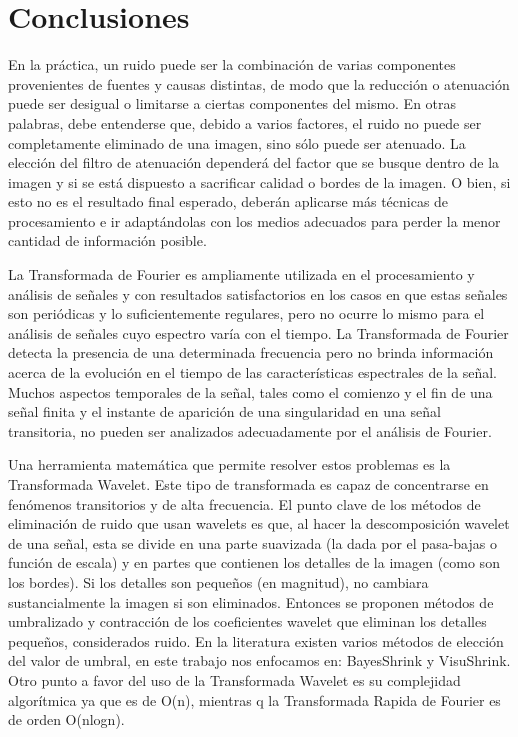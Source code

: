 \documentclass[a4paper,10pt,twocolumn]{article}
\begin{document}
\section{Conclusiones}\label{sec:conc}
 En la práctica, un ruido puede ser la combinación de varias componentes provenientes de fuentes y causas distintas, de modo que la reducción o atenuación puede ser desigual o limitarse a ciertas componentes del mismo. En otras palabras, debe entenderse que, debido a varios factores, el ruido no puede ser completamente eliminado de una imagen, sino sólo puede ser atenuado. La elección del filtro de atenuación dependerá del factor que se busque dentro de la imagen y si se está dispuesto a sacrificar calidad o bordes de la imagen. O bien, si esto no es el resultado final esperado, deberán aplicarse más técnicas de procesamiento e ir adaptándolas con los medios adecuados para perder la menor cantidad de información posible. 
  
 La Transformada de Fourier es ampliamente utilizada en el procesamiento y análisis de señales y con resultados satisfactorios en los casos en que estas señales son periódicas y lo suficientemente regulares, pero no ocurre lo mismo para el análisis de señales cuyo espectro varía con el tiempo. La Transformada de Fourier detecta la presencia de una determinada frecuencia pero no brinda información acerca de la evolución en el tiempo de las características espectrales de la señal. Muchos aspectos temporales de la señal, tales como el comienzo y el fin de una señal finita y el instante de aparición de una singularidad en una señal transitoria, no pueden ser analizados adecuadamente por el análisis de Fourier. 
 
 Una herramienta matemática que permite resolver estos problemas es la Transformada Wavelet. Este tipo de transformada es capaz de concentrarse en fenómenos transitorios y de alta frecuencia. El punto clave de los métodos de eliminación de ruido que usan wavelets es que, al hacer la descomposición wavelet de una señal, esta se divide en una parte suavizada (la dada por el pasa-bajas o función de escala) y en partes que contienen los detalles de la imagen (como son los bordes). Si los detalles son pequeños (en magnitud), no cambiara sustancialmente la imagen si son eliminados. Entonces se proponen métodos de umbralizado y contracción de los coeficientes wavelet que eliminan los detalles pequeños, considerados ruido. En la literatura existen varios métodos de elección del valor de umbral, en este trabajo nos enfocamos en: BayesShrink y VisuShrink. Otro punto a favor del uso de la Transformada Wavelet es su complejidad algorítmica ya que es de O(n), mientras q la Transformada Rapida de Fourier es de orden O(nlogn).  
   
\end{document}
